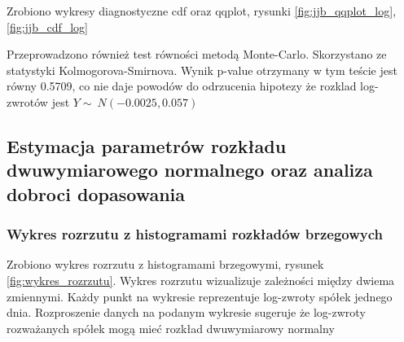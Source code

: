 \documentclass[a4paper,11pt]{article}
\begin{document}
Zrobiono wykresy diagnostyczne cdf oraz qqplot, rysunki \ref{fig:jjb_qqplot_log}, \ref{fig:jjb_cdf_log}

Przeprowadzono również test równości metodą Monte-Carlo. Skorzystano ze statystyki Kolmogorova-Smirnova. Wynik p-value otrzymany w tym teście jest równy 0.5709, co nie daje powodów do odrzucenia hipotezy że rozklad log-zwrotów jest  $Y \sim\  N(-0.0025,0.057 )$

\subsection{Estymacja parametrów rozkładu dwuwymiarowego normalnego oraz analiza dobroci dopasowania}

\subsubsection{Wykres rozrzutu z histogramami rozkładów brzegowych}

Zrobiono wykres rozrzutu z histogramami brzegowymi, rysunek \ref{fig:wykres_rozrzutu}. Wykres rozrzutu wizualizuje zależności między dwiema zmiennymi. Każdy punkt na wykresie reprezentuje log-zwroty spółek jednego dnia. Rozproszenie danych na podanym wykresie sugeruje że log-zwroty rozważanych spółek mogą mieć rozkład dwuwymiarowy normalny
\end{document}
